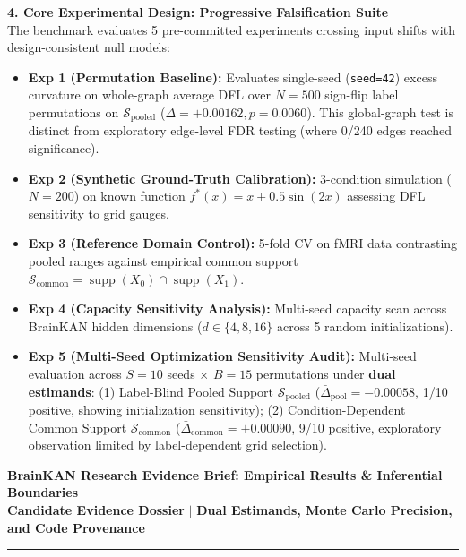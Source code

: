 \documentclass[9pt]{article}
\begin{document}
\textbf{\large 4. Core Experimental Design: Progressive Falsification Suite}\\[1pt]
The benchmark evaluates 5 pre-committed experiments crossing input shifts with design-consistent null models:
\begin{itemize}\itemsep -2.5pt
    \item \textbf{Exp 1 (Permutation Baseline):} Evaluates single-seed (\texttt{seed=42}) excess curvature on whole-graph average DFL over $N = 500$ sign-flip label permutations on $\mathcal{S}_{\mathrm{pooled}}$ ($\Delta = +0.00162, p = 0.0060$). This global-graph test is distinct from exploratory edge-level FDR testing (where 0/240 edges reached significance).
    \item \textbf{Exp 2 (Synthetic Ground-Truth Calibration):} 3-condition simulation ($N = 200$) on known function $f^*(x) = x + 0.5\sin(2x)$ assessing DFL sensitivity to grid gauges.
    \item \textbf{Exp 3 (Reference Domain Control):} 5-fold CV on fMRI data contrasting pooled ranges against empirical common support $\mathcal{S}_{\mathrm{common}} = \operatorname{supp}(X_0) \cap \operatorname{supp}(X_1)$.
    \item \textbf{Exp 4 (Capacity Sensitivity Analysis):} Multi-seed capacity scan across BrainKAN hidden dimensions ($d \in \{4, 8, 16\}$ across 5 random initializations).
    \item \textbf{Exp 5 (Multi-Seed Optimization Sensitivity Audit):} Multi-seed evaluation across $S = 10$ seeds $\times$ $B = 15$ permutations under \textbf{dual estimands}: (1) Label-Blind Pooled Support $\mathcal{S}_{\mathrm{pooled}}$ ($\bar{\Delta}_{\mathrm{pool}} = -0.00058$, 1/10 positive, showing initialization sensitivity); (2) Condition-Dependent Common Support $\mathcal{S}_{\mathrm{common}}$ ($\bar{\Delta}_{\mathrm{common}} = +0.00090$, 9/10 positive, exploratory observation limited by label-dependent grid selection).
\end{itemize}

\clearpage

\begin{center}
    {\large \textbf{BrainKAN Research Evidence Brief: Empirical Results \& Inferential Boundaries}}\\[1pt]
    \textbf{Candidate Evidence Dossier} \quad $\vert$ \quad \textbf{Dual Estimands, Monte Carlo Precision, and Code Provenance}
\end{center}
\vspace{-6pt}
\hrule
\vspace{3pt}
\end{document}

